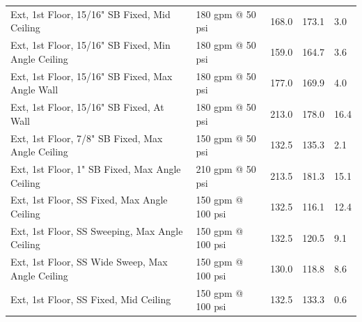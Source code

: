 \documentclass{article}
\begin{document}
\begin{table}[]
\begin{tabular}{lllll}
Ext, 1st Floor, 15/16" SB Fixed, Mid Ceiling          & 180 gpm @ 50 psi                    & 168.0                                  & 173.1                                   & 3.0                                     \\
Ext, 1st Floor, 15/16" SB Fixed, Min Angle Ceiling    & 180 gpm @ 50 psi                    & 159.0                                  & 164.7                                   & 3.6                                     \\
Ext, 1st Floor, 15/16" SB Fixed, Max Angle Wall       & 180 gpm @ 50 psi                    & 177.0                                  & 169.9                                   & 4.0                                     \\
Ext, 1st Floor, 15/16" SB Fixed, At Wall              & 180 gpm @ 50 psi                    & 213.0                                  & 178.0                                   & 16.4                                    \\
Ext, 1st Floor, 7/8" SB Fixed, Max Angle Ceiling      & 150 gpm @ 50 psi                    & 132.5                                  & 135.3                                   & 2.1                                     \\
Ext, 1st Floor, 1" SB Fixed, Max Angle Ceiling        & 210 gpm @ 50 psi                    & 213.5                                  & 181.3                                   & 15.1                                    \\
Ext, 1st Floor, SS Fixed, Max Angle Ceiling           & 150 gpm @ 100 psi                   & 132.5                                  & 116.1                                   & 12.4                                    \\
Ext, 1st Floor, SS Sweeping, Max Angle Ceiling        & 150 gpm @ 100 psi                   & 132.5                                  & 120.5                                   & 9.1                                     \\
Ext, 1st Floor, SS Wide Sweep, Max Angle Ceiling      & 150 gpm @ 100 psi                   & 130.0                                  & 118.8                                   & 8.6                                     \\
Ext, 1st Floor, SS Fixed, Mid Ceiling                 & 150 gpm @ 100 psi                   & 132.5                                  & 133.3                                   & 0.6                                     \\

\end{tabular}
\end{table}
\end{document}
